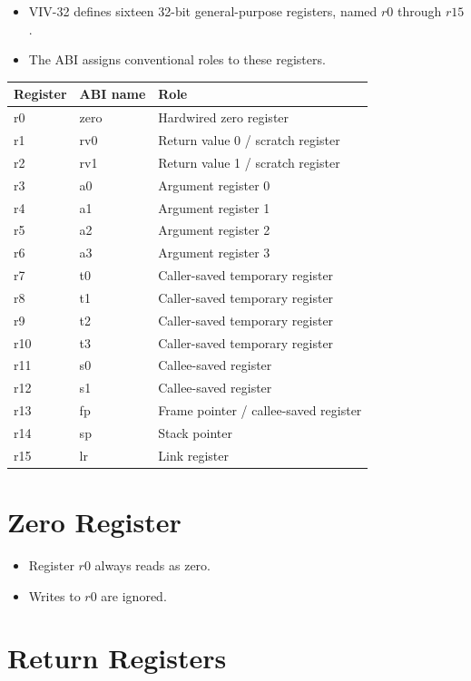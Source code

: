 \begin{itemize}
  \item VIV-32 defines sixteen 32-bit general-purpose registers, named \(r0\) through \(r15\).
  \item The ABI assigns conventional roles to these registers.
\end{itemize}

\begin{center}
\begin{tabular}{lll}
\hline
Register & ABI name & Role \\
\hline
r0  & zero & Hardwired zero register \\
r1  & rv0  & Return value 0 / scratch register \\
r2  & rv1  & Return value 1 / scratch register \\
r3  & a0   & Argument register 0 \\
r4  & a1   & Argument register 1 \\
r5  & a2   & Argument register 2 \\
r6  & a3   & Argument register 3 \\
r7  & t0   & Caller-saved temporary register \\
r8  & t1   & Caller-saved temporary register \\
r9  & t2   & Caller-saved temporary register \\
r10 & t3   & Caller-saved temporary register \\
r11 & s0   & Callee-saved register \\
r12 & s1   & Callee-saved register \\
r13 & fp   & Frame pointer / callee-saved register \\
r14 & sp   & Stack pointer \\
r15 & lr   & Link register \\
\hline
\end{tabular}
\end{center}

\section{Zero Register}

\begin{itemize}
  \item Register \(r0\) always reads as zero.
  \item Writes to \(r0\) are ignored.
\end{itemize}

\section{Return Registers}

